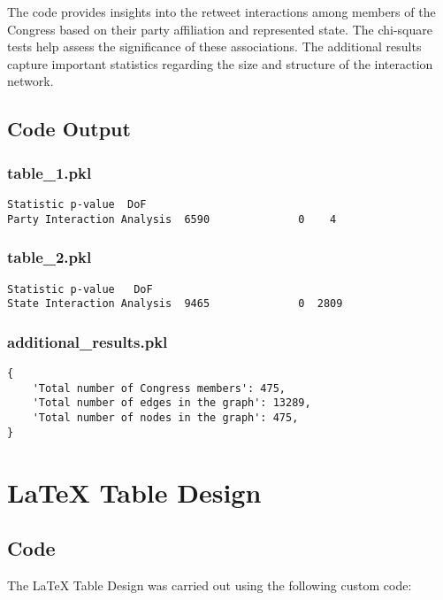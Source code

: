 \documentclass[11pt]{article}
\begin{document}
The code provides insights into the retweet interactions among members of the Congress based on their party affiliation and represented state. The chi-square tests help assess the significance of these associations. The additional results capture important statistics regarding the size and structure of the interaction network.

\subsection{Code Output}

\subsubsection*{table\_1.pkl}

\begin{Verbatim}[tabsize=4]
                              Statistic p-value  DoF
Party Interaction Analysis  6590              0    4
\end{Verbatim}

\subsubsection*{table\_2.pkl}

\begin{Verbatim}[tabsize=4]
                              Statistic p-value   DoF
State Interaction Analysis  9465              0  2809
\end{Verbatim}

\subsubsection*{additional\_results.pkl}

\begin{Verbatim}[tabsize=4]
{
    'Total number of Congress members': 475,
    'Total number of edges in the graph': 13289,
    'Total number of nodes in the graph': 475,
}
\end{Verbatim}

\section{LaTeX Table Design}
\subsection{{Code}}
The LaTeX Table Design was carried out using the following custom code:
\end{document}
